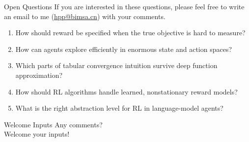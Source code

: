 \documentclass[aspectratio=169]{beamer}
\begin{document}
\begin{frame}{Open Questions}
\small
If you are interested in these questions, please feel free to write an email to me {\color{red}(\href{mailto:hpp@bimsa.cn}{hpp@bimsa.cn})} with your comments.

\begin{enumerate}
    \item How should reward be specified when the true objective is hard to measure?
    \item How can agents explore efficiently in enormous state and action spaces?
    \item Which parts of tabular convergence intuition survive deep function approximation?
    \item How should RL algorithms handle learned, nonstationary reward models?
    \item What is the right abstraction level for RL in language-model agents?
\end{enumerate}
\end{frame}

\begin{frame}{Welcome Inputs}
  \centering
  Any comments?
  \\[2em]
  Welcome your inputs!
\end{frame}
\end{document}
